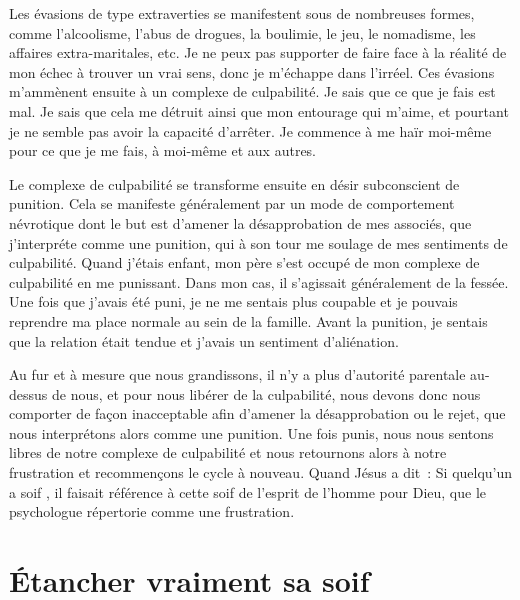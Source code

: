Les évasions de type extraverties se manifestent sous de nombreuses formes,
 comme l'alcoolisme, l'abus de drogues, la boulimie, le jeu, le nomadisme,
 les affaires extra-maritales, etc.
 Je ne peux pas supporter de faire face à la réalité de mon échec à trouver
 un vrai sens, donc je m'échappe dans l'irréel.
 Ces évasions m'ammènent ensuite à un complexe de culpabilité.
 Je sais que ce que je fais est mal. Je sais que cela me détruit
 ainsi que mon entourage qui m'aime, et pourtant je ne semble pas avoir
 la capacité d'arrêter. Je commence à me haïr moi-même pour ce que je me fais,
 à moi-même et aux autres.

Le complexe de culpabilité se transforme ensuite en désir subconscient
 de punition. Cela se manifeste généralement par un mode de comportement
 névrotique dont le but est d'amener la désapprobation de mes associés,
 que j'interpréte comme une punition, qui à son tour me soulage
 de mes sentiments de culpabilité. Quand j'étais enfant, mon père
 s'est occupé de mon complexe de culpabilité en me punissant.
 Dans mon cas, il s'agissait généralement de la fessée.
 Une fois que j'avais été puni, je ne me sentais plus coupable
 et je pouvais reprendre ma place normale au sein de la famille.
 Avant la punition, je sentais que la relation était tendue et j'avais
 un sentiment d'aliénation.

Au fur et à mesure que nous grandissons, il n'y a plus d'autorité parentale
 au-dessus de nous, et pour nous libérer de la culpabilité, nous devons donc
 nous comporter de façon inacceptable afin d'amener la désapprobation
 ou le rejet, que nous interprétons alors comme une punition.
 Une fois punis, nous nous sentons libres de notre complexe de culpabilité
 et nous retournons alors à notre frustration et recommençons le cycle
 à nouveau. Quand Jésus a dit~: \og Si quelqu'un a soif \fg{},
 il faisait référence à cette soif de l'esprit de l'homme pour Dieu,
 que le psychologue répertorie comme une frustration.
 \nowidow[6]


\section{\'Etancher vraiment sa soif}

